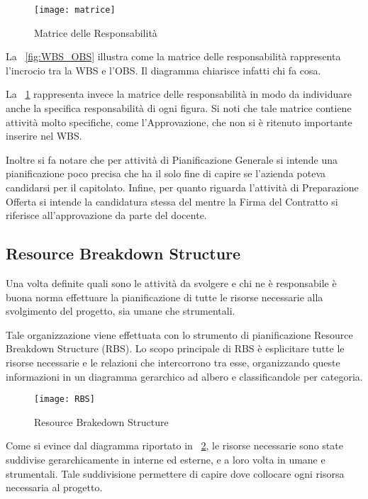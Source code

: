 \clearpage
\begin{figure}[!h]
  \texttt{[image: matrice]}
	\caption{Matrice delle Responsabilità}
  \label{fig:MATR}
\end{figure}

La \figurename~\ref{fig:WBS_OBS} illustra come la matrice delle responsabilità rappresenta l'incrocio tra la WBS e l'OBS. Il diagramma chiarisce infatti chi fa cosa.

La \figurename~\ref{fig:MATR} rappresenta invece la matrice delle responsabilità in modo da individuare anche la specifica responsabilità di ogni figura. Si noti che tale matrice contiene attività molto specifiche, come l'Approvazione, che non si è ritenuto importante inserire nel WBS.

Inoltre si fa notare che per attività di Pianificazione Generale si intende una pianificazione poco precisa che ha il solo fine di capire se l'azienda poteva candidarsi per il capitolato. Infine, per quanto riguarda l'attività di Preparazione Offerta si intende la candidatura stessa del  mentre la Firma del Contratto si riferisce all'approvazione da parte del docente.

\subsection{Resource Breakdown Structure}
Una volta definite quali sono le attività da svolgere e chi ne è responsabile è buona norma effettuare la pianificazione di tutte le risorse necessarie alla svolgimento del progetto, sia umane che strumentali.

Tale organizzazione viene effettuata con lo strumento di pianificazione Resource Breakdown Structure (RBS).
Lo scopo principale di RBS è esplicitare tutte le risorse necessarie e le relazioni che intercorrono tra esse, organizzando queste informazioni in un diagramma gerarchico ad albero e classificandole per categoria.

\begin{landscape}
\vskip 2in

\begin{figure}
\centering
  \texttt{[image: RBS]}
	\caption{Resource Brakedown Structure}
	\label{fig:RBS}
\end{figure}

\end{landscape}

Come si evince dal diagramma riportato in \figurename~\ref{fig:RBS}, le risorse necessarie sono state suddivise gerarchicamente in interne ed esterne, e a loro volta in umane e strumentali. Tale suddivisione permettere di capire dove collocare ogni risorsa necessaria al progetto.

